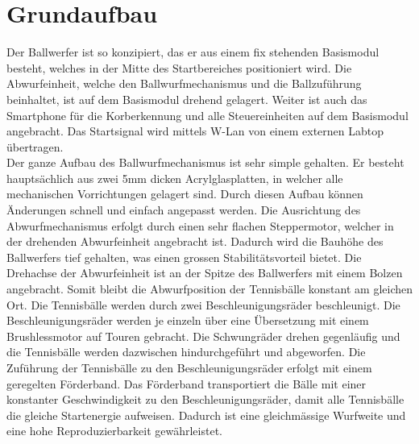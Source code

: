 \section{Grundaufbau}
    Der Ballwerfer ist so konzipiert, das er aus einem fix stehenden Basismodul besteht, 
    welches in der Mitte des Startbereiches positioniert wird. Die Abwurfeinheit, welche 
    den Ballwurfmechanismus und die Ballzuführung beinhaltet, ist auf dem Basismodul 
    drehend gelagert. Weiter ist auch das Smartphone für die Korberkennung und alle 
    Steuereinheiten auf dem Basismodul angebracht. Das Startsignal wird mittels W-Lan 
    von einem externen Labtop übertragen.\\
    Der ganze Aufbau des Ballwurfmechanismus ist sehr simple gehalten. Er besteht 
    hauptsächlich aus zwei 5mm dicken Acrylglasplatten, in welcher alle mechanischen 
    Vorrichtungen gelagert sind. Durch diesen Aufbau können Änderungen schnell und 
    einfach angepasst werden. Die Ausrichtung des Abwurfmechanismus erfolgt durch 
    einen sehr flachen Steppermotor, welcher in der drehenden Abwurfeinheit angebracht 
    ist. Dadurch wird die Bauhöhe des Ballwerfers tief gehalten, was einen grossen 
    Stabilitätsvorteil bietet. Die Drehachse der Abwurfeinheit ist an der Spitze des 
    Ballwerfers mit einem Bolzen angebracht. Somit bleibt die Abwurfposition der 
    Tennisbälle konstant am gleichen Ort. Die Tennisbälle werden durch zwei 
    Beschleunigungsräder beschleunigt. Die Beschleunigungsräder werden je einzeln 
    über eine Übersetzung mit einem Brushlessmotor auf Touren gebracht. Die Schwungräder 
    drehen gegenläufig und die Tennisbälle werden dazwischen hindurchgeführt und 
    abgeworfen. Die Zuführung der Tennisbälle zu den Beschleunigungsräder erfolgt mit 
    einem geregelten Förderband. Das Förderband transportiert die Bälle mit einer 
    konstanter Geschwindigkeit zu den Beschleunigungsräder, damit alle Tennisbälle die 
    gleiche Startenergie aufweisen. Dadurch ist eine gleichmässige Wurfweite und eine 
    hohe Reproduzierbarkeit gewährleistet.\\
